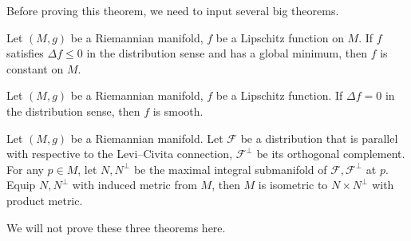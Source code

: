Before proving this theorem, we need to input several big theorems.

\begin{thm}
    Let $(M,g)$ be a Riemannian manifold, $f$ be a Lipschitz function on $M$.
    If $f$ satisfies $\Delta f\leq 0$ in the distribution sense and has a global minimum, then $f$ is constant on $M$.
\end{thm}

\begin{thm}
    Let $(M,g)$ be a Riemannian manifold, $f$ be a Lipschitz function.
    If $\Delta f=0$ in the distribution sense, then $f$ is smooth.
\end{thm}

\begin{thm}
    Let $(M,g)$ be a Riemannian manifold.
    Let $\mathcal{F}$ be a distribution that is parallel with respective to the Levi--Civita connection, $\mathcal{F}^\perp$ be its orthogonal complement.
    For any $p\in M$, let $N,N^\perp$ be the maximal integral submanifold of $\mathcal{F},\mathcal{F}^\perp$ at $p$.
    Equip $N,N^\perp$ with induced metric from $M$, then $M$ is isometric to $N\times N^\perp$ with product metric.
\end{thm}

We will not prove these three theorems here.

